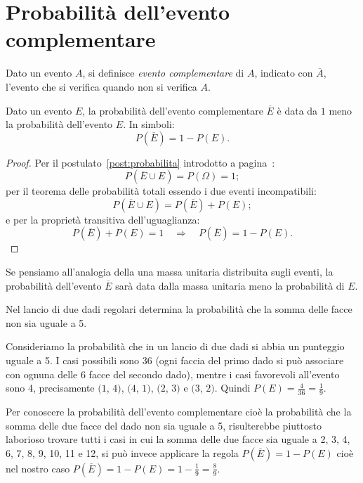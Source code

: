 \vspazio\ovalbox{\risolvii \ref{ese:9.27}, \ref{ese:9.28}, \ref{ese:9.29}, \ref{ese:9.30}, \ref{ese:9.31}, \ref{ese:9.32}, \ref{ese:9.33}, \ref{ese:9.34}, \ref{ese:9.35}, \ref{ese:9.36} \ref{ese:9.37}}

\section{Probabilità dell'evento complementare }

\begin{definizione}
Dato un evento $A$, si definisce \emph{evento complementare} di $A$, indicato con $\overline A$, l'evento che si verifica quando non si verifica $A$.
\end{definizione}

\begin{teorema}
Dato un evento $E$, la probabilità dell'evento complementare $\overline E$ è data da $1$ meno la probabilità dell'evento $E$. In simboli: \[ P(\overline E)=1-P(E). \]
\end{teorema}
\begin{proof} Per il postulato~\ref{post:probabilita} introdotto a pagina~\pageref{post:probabilita}: \[ P(\overline E\cup E)=P(\Omega)=1; \]
per il teorema delle probabilità totali essendo i due eventi incompatibili: \[ P(\overline E\cup E)=P(\overline E)+P(E); \]
e per la proprietà transitiva dell'uguaglianza: \[ P(\overline E)+P(E)=1 \quad\Rightarrow\quad P(\overline E)=1-P(E). \]
\end{proof}

Se pensiamo all'analogia della una massa unitaria distribuita sugli eventi, la probabilità dell'evento $\overline E$ sarà data dalla massa unitaria meno la probabilità di $E$.

\begin{exrig}
\begin{esempio}
Nel lancio di due dadi regolari determina la probabilità che la somma delle facce non sia uguale a 5.

Consideriamo la probabilità che in un lancio di due dadi si abbia un punteggio uguale a 5. I casi possibili sono 36 (ogni faccia del primo dado si può associare con ognuna delle 6 facce del secondo dado), mentre i casi favorevoli all'evento sono 4, precisamente $(1$, $4)$, $(4$, $1)$, $(2$, $3)$ e $(3$, $2)$. Quindi $P(E)=\frac 4{36}=\frac 1 9$.

Per conoscere la probabilità dell'evento complementare cioè la probabilità che la somma delle due facce del dado non sia uguale a 5, risulterebbe piuttosto laborioso trovare tutti i casi in cui la somma delle due facce sia uguale a 2, 3, 4, 6, 7, 8, 9, 10, 11 e 12, si può invece applicare la regola $P(\overline E)=1-P(E)$ cioè nel nostro caso $P(\overline E)=1-P(E)=1-\frac 1 9=\frac 8 9$.
\end{esempio}
\end{exrig}

